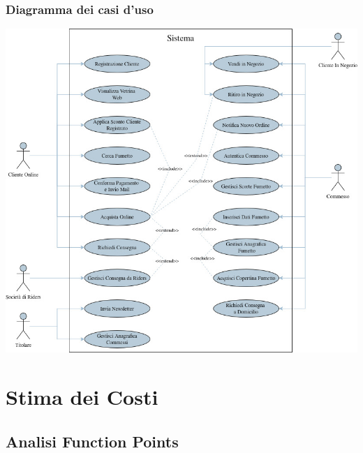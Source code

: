 \documentclass[12pt, a4paper]{article}
\begin{document}
\subsubsection{Diagramma dei casi d'uso}
\begin{center}
  \includegraphics[scale=0.58]{./public/usecasediagram.jpg}
\end{center}

\section{Stima dei Costi}
\subsection{Analisi Function Points}
\end{document}
